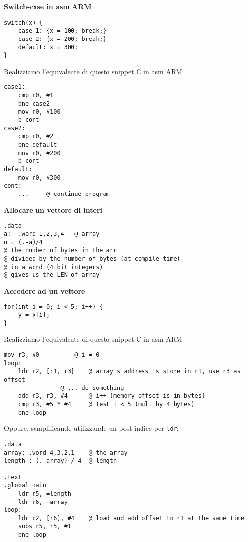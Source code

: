 \begin{defn}
\textbf{Switch-case in asm ARM}

\begin{lstlisting}
switch(x) {
	case 1: {x = 100; break;}
	case 2: {x = 200; break;}
	default: x = 300;
}
\end{lstlisting}

Realizziamo l'equivalente di questo snippet C in asm ARM

\begin{lstlisting}[style=armn]
case1:
	cmp r0, #1
	bne case2
	mov r0, #100
	b cont
case2:
	cmp r0, #2
	bne default
	mov r0, #200
	b cont
default:
	mov r0, #300
cont:
	... 	@ continue program
\end{lstlisting}
\end{defn}

\begin{exmp}
	\textbf{Allocare un vettore di interi}

\begin{lstlisting}[style=armn]
.data
a:	.word 1,2,3,4	@ array
n =	(.-a)/4
@ the number of bytes in the arr
@ divided by the number of bytes (at compile time)
@ in a word (4 bit integers)
@ gives us the LEN of array
\end{lstlisting}
\end{exmp}

\begin{exmp}
\textbf{Accedere ad un vettore}
\begin{lstlisting}
for(int i = 0; i < 5; i++) {
	y = x[i];
}
\end{lstlisting}

Realizziamo l'equivalente di questo snippet C in asm ARM

\begin{lstlisting}[style=armn]
mov r3, #0 			@ i = 0
loop:
	ldr r2, [r1, r3]	@ array's address is store in r1, use r3 as offset
				@ ... do something
	add r3, r3, #4 		@ i++ (memory offset is in bytes)
	cmp r3, #5 * #4		@ test i < 5 (mult by 4 bytes)
	bne loop
\end{lstlisting}

Oppure, semplificando utilizzando un post-indice per \verb|ldr|:

\begin{lstlisting}[style=armn]
.data
array: .word 4,3,2,1    @ the array
length : (.-array) / 4	@ length

.text
.global main
	ldr r5, =length
	ldr r6, =array
loop:
	ldr r2, [r6], #4	@ load and add offset to r1 at the same time
	subs r5, r5, #1
	bne loop
\end{lstlisting}
\end{exmp}

